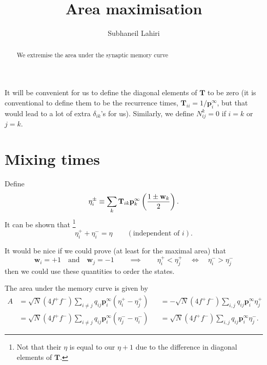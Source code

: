 \documentclass[12pt]{article}
\title{Area maximisation}
\author{Subhaneil Lahiri
%
}
\newcommand{\means}{\Longleftrightarrow}
\newcommand{\pp}{\mathbf{p}^\infty}
\newcommand{\T}{\mathbf{T}}
\newcommand{\w}{\mathbf{w}}
\begin{document}
\maketitle





\begin{abstract}
  We extremise the area under the synaptic memory curve
\end{abstract}



It will be convenient for us to define the diagonal elements of $\T$ to be zero (it is conventional to define them to be the recurrence times, $\T_{ii} = 1/\pp_i$, but that would lead to a lot of extra $\delta_{ik}$'s for us). Similarly, we define $N^k_{ij}=0$ if $i=k$ or $j=k$.


\section{Mixing times}\label{sec:mixing}

Define
%
\begin{equation}\label{eq:mixingpm}
  \eta^\pm_i \equiv \sum_k \T_{ik} \pp_k \prn{\frac{1 \pm \w_k}{2}}.
\end{equation}
%
It can be shown that \cite{hunter2006mixing}\footnote{Not that their $\eta$ is equal to our $\eta+1$ due to the difference in diagonal elements of $\T$.}
%
\begin{equation}\label{eq:mixing}
  \eta^+_i + \eta^-_i = \eta \qquad (\text{independent of }i).
\end{equation}
%

It would be nice if we could prove (at least for the maximal area) that
%
\begin{equation}\label{eq:orderinghelp}
  \w_i = +1 \quad \text{and} \quad \w_j = -1
  \qquad \implies \qquad
  \eta^+_i < \eta^+_j
  \quad \means \quad
  \eta^-_i > \eta^-_j
\end{equation}
%
then we could use these quantities to order the states.

The area under the memory curve is given by
%
\begin{equation}\label{eq:areamixing}
\begin{aligned}
  A &= \sqrt{N}(4f^+f^-) \sum_{i \neq j} q_{ij} \pp_i (\eta^+_i - \eta^+_j)
   &&= -\sqrt{N}(4f^+f^-) \sum_{i , j} q_{ij} \pp_i \eta^+_j\\
   &= \sqrt{N}(4f^+f^-) \sum_{i \neq j} q_{ij} \pp_i (\eta^-_j - \eta^-_i)
   &&= \sqrt{N}(4f^+f^-) \sum_{i , j} q_{ij} \pp_i\eta^-_j .
\end{aligned}
\end{equation}
%
\end{document}
